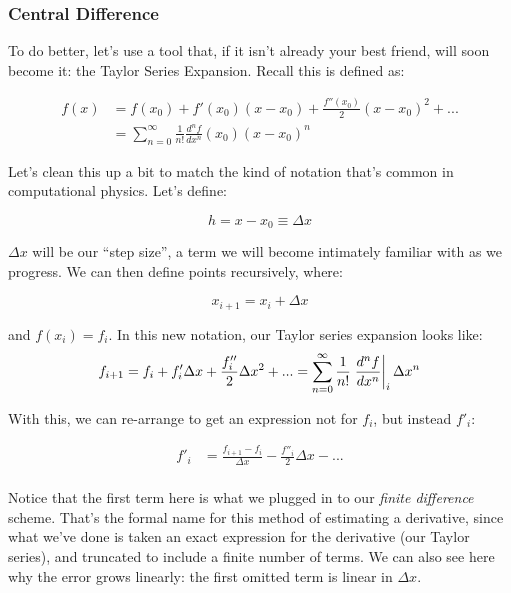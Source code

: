 \documentclass{article}
\theoremstyle{demo}
\begin{document}
\subsubsection{Central Difference}
To do better, let's use a tool that, if it isn't already your best friend, will
soon become it: the Taylor Series Expansion.  Recall this is defined as:

\begin{equation}
    \begin{aligned}
        f(x) & = f(x_0) + f'(x_0)(x - x_0) + \frac{f''(x_0)}{2}(x-x_0)^2 + ... \\
        & = \sum_{n=0}^\infty \frac{1}{n!} \frac{d^n f}{dx^n}(x_0) (x-x_0)^n
    \end{aligned}
\end{equation}

Let's clean this up a bit to match the kind of notation that's common in
computational physics.  Let's define:

\begin{equation}
    h = x - x_0 \equiv \Delta x
\end{equation}

$\Delta x$ will be our ``step size'', a term we will become intimately familiar
with as we progress.  We can then define points recursively, where:

\begin{equation}
    x_{i+1} = x_i + \Delta x
\end{equation}

and $f(x_i) = f_i$. In this new notation, our Taylor series expansion looks
like:
\begin{equation}
    f_{i+1} = f_i + f'_i \Delta x + \frac{f''_i}{2}\Delta x^2 + ... =
    \sum_{n=0}^\infty \frac{1}{n!} \left.\frac{d^n f}{dx^n}\right|_i \Delta x^n\\
\end{equation}

With this, we can re-arrange to get an expression not for $f_i$, but instead
$f'_i$:

\begin{equation}
    \begin{aligned}
        f'_i & = \frac{f_{i+1} - f_i}{\Delta x} - \frac{f''_i}{2}\Delta x - ...\\
    \end{aligned}
\end{equation}

Notice that the first term here is what we plugged in to our \textit{finite
difference} scheme.  That's the formal name for this method of estimating a
derivative, since what we've done is taken an exact expression for the
derivative (our Taylor series), and truncated to include a finite number of
terms.  We can also see here why the error grows linearly:  the first omitted
term is linear in $\Delta x$.
\end{document}
